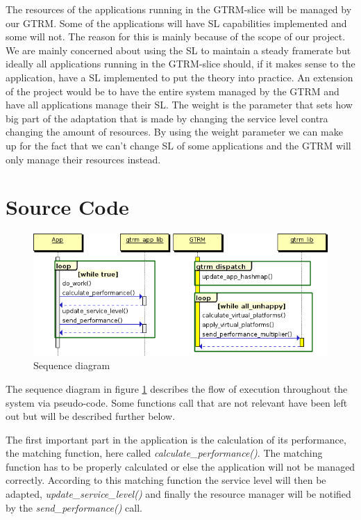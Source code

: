 \documentclass[nobiblatex]{LTHthesis}
\begin{document}
The resources of the applications running in the GTRM-slice will be managed by our GTRM. Some of the applications will have SL capabilities implemented and some will not. The reason for this is mainly because of the scope of our project. We are mainly concerned about using the SL to maintain a steady framerate but ideally all applications running in the GTRM-slice should, if it makes sense to the application, have a SL implemented to put the theory into practice. An extension of the project would be to have the entire system managed by the GTRM and have all applications manage their SL. The weight is the parameter that sets how big part of the adaptation that is made by changing the service level contra changing the amount of resources. By using the weight parameter we can make up for the fact that we can’t change SL of some applications and the GTRM will only manage their resources instead. 

\section{Source Code}
\begin{figure}
    \centering
    \includegraphics[width=\textwidth]{diag.png}
    \caption{Sequence diagram}
    \label{fig:sdiag}
\end{figure}
The sequence diagram in figure \ref{fig:sdiag} describes the flow of execution throughout the system via pseudo-code. Some functions call that are not relevant have been left out but will be described further below. 

The first important part in the application is the calculation of its performance, the matching function, here called \emph{calculate\_performance()}. The matching function has to be properly calculated or else the application will not be managed correctly. According to this matching function the service level will then be adapted, \emph{update\_service\_level()} and finally the resource manager will be notified by the \emph{send\_performance()} call.
\end{document}
